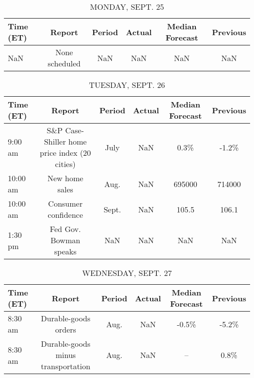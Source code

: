 \documentclass{article}%
\begin{document}
%
\normalsize%


\begin{table}[htbp]%
\caption{MONDAY, SEPT. 25}%
\centering%
\begin{adjustbox}{width=1\textwidth}%
\begin{tabular}{lccccc}
\toprule
Time (ET) &         Report & Period & Actual & Median Forecast & Previous \\
\midrule
      NaN & None scheduled &    NaN &    NaN &             NaN &      NaN \\
\bottomrule
\end{tabular}
%
\end{adjustbox}%
\end{table}

%


\begin{table}[htbp]%
\caption{TUESDAY, SEPT. 26}%
\centering%
\begin{adjustbox}{width=1\textwidth}%
\begin{tabular}{lccccc}
\toprule
Time (ET) &                                        Report & Period & Actual & Median Forecast & Previous \\
\midrule
  9:00 am & S\&P Case-Shiller home price index (20 cities) &   July &    NaN &            0.3\% &    -1.2\% \\
 10:00 am &                                New home sales &   Aug. &    NaN &          695000 &   714000 \\
 10:00 am &                           Consumer confidence &  Sept. &    NaN &           105.5 &    106.1 \\
  1:30 pm &                        Fed Gov. Bowman speaks &    NaN &    NaN &             NaN &      NaN \\
\bottomrule
\end{tabular}
%
\end{adjustbox}%
\end{table}

%


\begin{table}[htbp]%
\caption{WEDNESDAY, SEPT. 27}%
\centering%
\begin{adjustbox}{width=1\textwidth}%
\begin{tabular}{lccccc}
\toprule
Time (ET) &                             Report & Period & Actual & Median Forecast & Previous \\
\midrule
  8:30 am &               Durable-goods orders &   Aug. &    NaN &           -0.5\% &    -5.2\% \\
  8:30 am & Durable-goods minus transportation &   Aug. &    NaN &              -- &     0.8\% \\
\bottomrule
\end{tabular}
%
\end{adjustbox}%
\end{table}
\end{document}
